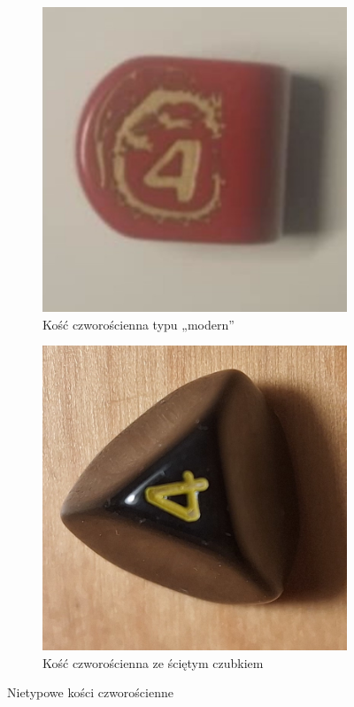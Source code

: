 \begin{figure}[h]
    \centering
      \begin{subfigure}{.43\textwidth}
        \includegraphics[width=.9\linewidth]{chapters/02-teoria/figures/modern_k4}
        \caption{\label{fig:modern_k4}Kość czworościenna typu „modern”}
      \end{subfigure}%
      \begin{subfigure}{.45\textwidth}
        \includegraphics[width=.9\linewidth, angle=-90, clip]{chapters/02-teoria/figures/nietypowe_k4}
        \caption{\label{fig:nietypowe_k4}Kość czworościenna ze ściętym czubkiem}
      \end{subfigure}%
    \caption{Nietypowe kości czworościenne}
    \label{fig:nietypowe_modern_k4}
\end{figure}